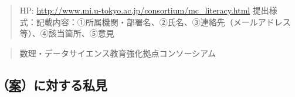 \documentclass[
]{book}
\theoremstyle{definition}
\theoremstyle{definition}
\theoremstyle{definition}
\theoremstyle{definition}
\theoremstyle{remark}
\begin{document}
\begin{quote}
HP: \url{http://www.mi.u-tokyo.ac.jp/consortium/mc_literacy.html}
提出様式：記載内容：①所属機関・部署名、②氏名、③連絡先（メールアドレス等）、④該当箇所、⑤意見
\end{quote}

\begin{quote}
数理・データサイエンス教育強化拠点コンソーシアム
\end{quote}

\hypertarget{ux6848ux306bux5bfeux3059ux308bux79c1ux898b}{%
\subsection{\texorpdfstring{（\href{http://www.mi.u-tokyo.ac.jp/consortium/pdf/model_curriculum.pdf}{案}）に対する私見}{（案）に対する私見}}\label{ux6848ux306bux5bfeux3059ux308bux79c1ux898b}}
\end{document}
